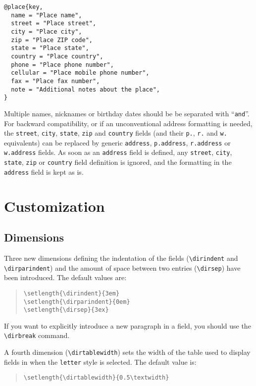 \documentclass[10pt]{article}
\begin{document}
\begin{verbatim}
@place{key,
  name = "Place name",
  street = "Place street",
  city = "Place city",
  zip = "Place ZIP code",
  state = "Place state",
  country = "Place country",
  phone = "Place phone number",
  cellular = "Place mobile phone number",
  fax = "Place fax number",
  note = "Additional notes about the place",
}
\end{verbatim}

Multiple names, nicknames or birthday dates should be be separated with
``\texttt{and}''. For backward compatibility, or if an unconventional
address formatting is needed, the \texttt{street}, \texttt{city},
\texttt{state}, \texttt{zip} and \texttt{country} fields (and their
\texttt{p.}, \texttt{r.} and \texttt{w.}  equivalents) can be replaced by
generic \texttt{address}, \texttt{p.address}, \texttt{r.address} or
\texttt{w.address} fields. As soon as an \texttt{address} field is defined,
any \texttt{street}, \texttt{city}, \texttt{state}, \texttt{zip} or
\texttt{country} field definition is ignored, and the formatting in the
\texttt{address} field is kept as is.

\section{Customization}
\label{sec:custom}

\subsection{Dimensions}

Three new dimensions defining the indentation of the fields (\verb'\dirindent'
and \verb'\dirparindent') and the amount of space between two entries
(\verb'\dirsep') have been introduced. The default values are:
\begin{quote}
\begin{verbatim}
\setlength{\dirindent}{3em}
\setlength{\dirparindent}{0em}
\setlength{\dirsep}{3ex}
\end{verbatim}
\end{quote}

If you want to explicitly introduce a new paragraph in a field, you
should use the \verb'\dirbreak' command.

A fourth dimension (\verb'\dirtablewidth') sets the width of the table used
to display fields in when the \texttt{letter} style is selected. The default
value is:
\begin{quote}
\begin{verbatim}
\setlength{\dirtablewidth}{0.5\textwidth}
\end{verbatim}
\end{quote}
\end{document}
